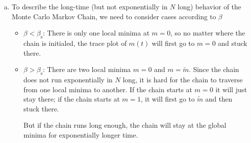 \documentclass[a4paper,oneside,12pt]{article}
\begin{document}
\begin{solution}
\begin{enumerate}[(a)]
\item   
        To describe the long-time (but not exponentially in $ N $ long) behavior of the Monte Carlo Markov Chain, we need to consider cases according to $ \beta $
        \begin{itemize}
        \item   $ \beta < \beta_{\mathrm{s}} $:
                There is only one local minima at $ m = 0 $, so no matter where the chain is initialed, the trace plot of $ m(t) $ will first go to $ m = 0 $ and stuck there.
        \item   $ \beta > \beta_{\mathrm{s}} $: 
                There are two local minima $ m = 0 $ and $ m = \tilde{m} $.
                Since the chain does not run exponentially in $ N $ long, it is hard for the chain to traverse from one local minima to another.
                If the chain starts at $ m = 0 $ it will just stay there; if the chain starts at $ m = 1 $, it will first go to $ \tilde{m} $ and then stuck there.

                But if the chain runs long enough, the chain will stay at the global minima for exponentially longer time.
        \end{itemize}
\end{enumerate}
\end{solution}
\end{document}
